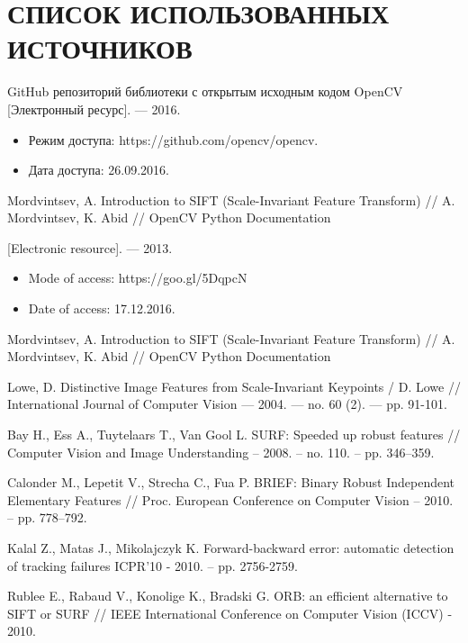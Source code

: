 \chapter*{СПИСОК ИСПОЛЬЗОВАННЫХ ИСТОЧНИКОВ}

\begin{enumerate}
    \item \label{itm:opencv} {GitHub репозиторий библиотеки с открытым исходным кодом OpenCV [Электронный ресурс]. — 2016.
    \begin{itemize}
        \item Режим доступа: https://github.com/opencv/opencv.
        \item Дата доступа: 26.09.2016.
    \end{itemize}
    
    \item \label{opencv-sift} Mordvintsev, A. Introduction to SIFT (Scale-Invariant Feature Transform) // A. Mordvintsev, K. Abid // OpenCV Python Documentation
    
    [Electronic resource]. — 2013. 
    \begin{itemize} 
        \item Mode of access: https://goo.gl/5DqpcN
        \item Date of access: 17.12.2016.
    \end{itemize}}
    
    \item \label{itm:opencv-sift} Mordvintsev, A. Introduction to SIFT (Scale-Invariant Feature Transform) // A. Mordvintsev, K. Abid // OpenCV Python Documentation
    
    \item \label{itm:lowe} Lowe, D. Distinctive Image Features from Scale-Invariant Keypoints / D. Lowe // International Journal of Computer Vision — 2004. — no. 60 (2). — pp. 91-101.
    
    \item \label{itm:surf} Bay H., Ess A., Tuytelaars T., Van Gool L. SURF: Speeded up robust features // Computer Vision and Image Understanding – 2008. – no. 110. – pp. 346–359.
    
    \item \label{itm:brief} Calonder M., Lepetit V., Strecha C., Fua P. BRIEF: Binary Robust Independent Elementary Features // Proc. European Conference on Computer Vision – 2010. – pp. 778–792.
    
    \item \label{itm:gloh} Kalal Z., Matas J., Mikolajczyk K. Forward-backward error: automatic detection of tracking failures ICPR’10 - 2010. – pp. 2756-2759.
    
    \item \label{itm:orb} Rublee E., Rabaud V., Konolige K., Bradski G. ORB: an efficient alternative to SIFT or SURF // IEEE International Conference on Computer Vision (ICCV) - 2010.
\end{enumerate}

\newpage